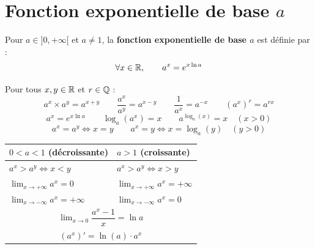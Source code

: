 \section{Fonction exponentielle de base \texorpdfstring{$a$}{a}}

\begin{definition}
  Pour $a \in ]0,+\infty[$ et $a \neq 1$,
  la \textbf{fonction exponentielle de base $a$} est d\'{e}finie par :
  \[
    \forall x \in \mathbb{R}, \qquad a^x = e^{x\ln a}
  \]
\end{definition}

\begin{propriete}
  Pour tous $x, y \in \mathbb{R}$ et $r \in \mathbb{Q}$ :
  \[
    a^x \times a^y = a^{x+y} \qquad
    \frac{a^x}{a^y} = a^{x-y} \qquad
    \frac{1}{a^x} = a^{-x} \qquad
    (a^x)^r = a^{rx}
  \]
  \[
    a^x = e^{x\ln a} \qquad
    \log_a(a^x) = x \qquad
    a^{\log_a(x)} = x \quad (x > 0)
  \]
  \[
    a^x = a^y \iff x = y \qquad
    a^x = y \iff x = \log_a(y) \quad (y > 0)
  \]
\end{propriete}
\newpage
\begin{propriete}
  \bigskip
  \begin{center}
  \renewcommand{\arraystretch}{2}
  \begin{tabular}{|p{6cm}|p{6cm}|}
    \hline
    \textbf{\color{burgundy}$0 < a < 1$ \quad (d\'{e}croissante)}
      & \textbf{\color{forest}$a > 1$ \quad (croissante)} \\
    \hline\hline
    $a^x > a^y \iff x < y$
      & $a^x > a^y \iff x > y$ \\
    \hline
    $\displaystyle\lim_{x \to +\infty} a^x = 0$
      & $\displaystyle\lim_{x \to +\infty} a^x = +\infty$ \\
    \hline
    $\displaystyle\lim_{x \to -\infty} a^x = +\infty$
      & $\displaystyle\lim_{x \to -\infty} a^x = 0$ \\
    \hline
    \multicolumn{2}{|c|}{%
      $\displaystyle\lim_{x \to 0} \dfrac{a^x - 1}{x} = \ln a$
    } \\
    \hline
    \multicolumn{2}{|c|}{%
      $(a^x)' = \ln(a) \cdot a^x$
    } \\
    \hline
  \end{tabular}
  \end{center}
\end{propriete}

